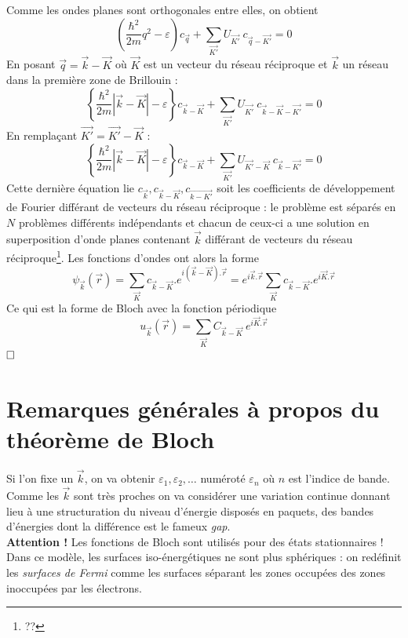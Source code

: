 	Comme les ondes planes sont orthogonales entre elles, on obtient
	\begin{equation}
	\left(\frac{\hbar^2}{2m}q^2
	-\varepsilon\right)c_{\vec{q}} + \sum_{\vec{K'}}U_{\vec{K'}}\ c_{\vec{
	q}-\vec{K'}}=0
	\end{equation}
	En posant $\vec{q}=\vec{k}-\vec{K}$ où $\vec{K}$ est un vecteur du 
	réseau réciproque et $\vec{k}$ un réseau dans la première zone de 
	Brillouin :
	\begin{equation}
	\left\{\frac{\hbar^2}{2m}|\vec{k}-\vec{K}|-\varepsilon\right\}c_{
	\vec{k}-\vec{K}}+\sum_{\vec{K'}}U_{\vec{K'}}\ c_{\vec{k}-\vec{K}-
	\vec{K'}}=0
	\end{equation}
	En remplaçant $\vec{K'} = \vec{K'}-\vec{K}$ :
	\begin{equation}
	\left\{\frac{\hbar^2}{2m}|\vec{k}-\vec{K}|-\varepsilon\right\}c_{
	\vec{k}-\vec{K}}+\sum_{\vec{K'}}U_{\vec{K'}-\vec{K}}\ c_{\vec{k}-\vec{K'}
	}=0
	\end{equation}	
	Cette dernière équation lie $c_{\vec{k}}, c_{\vec{k}-\vec{K}}, c_{
	\vec{k-K'}}$ soit les coefficients de développement de Fourier 
	différant de vecteurs du réseau réciproque : le problème est séparés 
	en $N$ problèmes différents indépendants et chacun de ceux-ci a une 
	solution en superposition d'onde planes contenant $\vec{k}$ différant 
	de vecteurs du réseau réciproque\footnote{??}. Les fonctions d'ondes 
	ont alors la forme 
	\begin{equation}
	\psi_{\vec{k}}(\vec{r}) = \sum_{\vec{K}}c_{\vec{k}-\vec{K}}.e^{i(\vec{k}
	-\vec{K}).\vec{r}} = e^{i\vec{k}.\vec{r}}\sum_{\vec{K}}c_{\vec{k}-
	\vec{K}}.e^{i\vec{K}.\vec{r}}
	\end{equation}
	Ce qui est la forme de Bloch avec la fonction périodique 
	\begin{equation}
	u_{\vec{k}}(\vec{r}) = \sum_{\vec{K}}C_{\vec{k}-\vec{K}}\ e^{i\vec{K}.
	\vec{r}}
	\end{equation}
	$\hfill\square$
	
	\section{Remarques générales à propos du théorème de Bloch}
	Si l'on fixe un $\vec k$, on va obtenir $\varepsilon_1,\varepsilon_2, 
	\dots$ numéroté $\varepsilon_n$ où $n$ est l'indice de bande. Comme 
	les $\vec{k}$ sont très proches on va considérer une variation continue 
	donnant lieu à une structuration du niveau d'énergie disposés en 
	paquets, des bandes d'énergies dont la différence est le fameux 
	\textit{gap}.\\
	
	\textbf{Attention !} Les fonctions de Bloch sont utilisés pour des 
	états stationnaires ! Dans ce modèle, les surfaces iso-énergétiques ne 
	sont plus sphériques : on redéfinit les \textit{surfaces de Fermi} 
	comme les surfaces séparant les zones occupées des zones inoccupées 
	par les électrons.